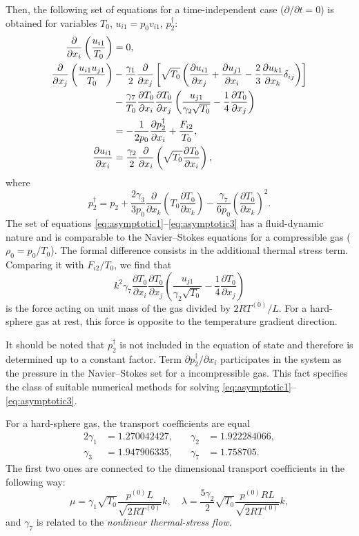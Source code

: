 \documentclass[smallextended, referee]{svjour3} %
\newcommand{\pder}[2][]{\frac{\partial#1}{\partial#2}}
\newcommand{\Pder}[2][]{\partial#1/\partial#2}
\begin{document}
Then, the following set of equations for a time-independent case (\(\Pder{t} = 0\))
is obtained for variables \(T_0\), \(u_{i1} = p_0v_{i1}\), \(p_2^\dag\):
\begin{align}
	\pder{x_i}\left(\frac{u_{i1}}{T_0}\right) &= 0, \label{eq:asymptotic1} \\
	\pder{x_j}\left(\frac{u_{i1}u_{j1}}{T_0}\right)
		&-\frac{\gamma_1}2\pder{x_j}\left[\sqrt{T_0}\left(
			\pder[u_{i1}]{x_j}+\pder[u_{j1}]{x_i}-\frac23\pder[u_{k1}]{x_k}\delta_{ij}\right
		)\right] \notag\\
		&- \frac{\gamma_7}{T_0}\pder[T_0]{x_i}\pder[T_0]{x_j}\left(\frac{u_{j1}}{\gamma_2\sqrt{T_0}} - \frac{1}4\pder[T_0]{x_j}\right) \notag\\
		&= -\frac1{2p_0}\pder[p_2^\dag]{x_i} + \frac{F_{i2}}{T_0}, \label{eq:asymptotic2} \\
	\pder[u_{i1}]{x_i} &= \frac{\gamma_2}2\pder{x_i}\left(\sqrt{T_0}\pder[T_0]{x_i}\right), \label{eq:asymptotic3}
\end{align}
where
\begin{equation}\label{eq:dag_pressure}
	p_2^\dag = p_2 +
		\frac{2\gamma_3}{3p_0}\pder{x_k}\left(T_0\pder[T_0]{x_k}\right) -
		\frac{\gamma_7}{6p_0}\left(\pder[T_0]{x_k}\right)^2.
\end{equation}
The set of equations \eqref{eq:asymptotic1}--\eqref{eq:asymptotic3} has a fluid-dynamic nature
and is comparable to the Navier--Stokes equations for a compressible gas (\(\rho_0 = p_0/T_0\)).
The formal difference consists in the additional thermal stress term.
Comparing it with \(F_{i2}/T_0\), we find that
\begin{equation}\label{eq:force}
	k^2\gamma_7\pder[T_0]{x_i}\pder[T_0]{x_j}\left(\frac{u_{j1}}{\gamma_2\sqrt{T_0}} - \frac{1}4\pder[T_0]{x_j}\right)
\end{equation}
is the force acting on unit mass of the gas divided by \(2RT^{(0)}/L\).
For a hard-sphere gas at rest, this force is opposite to the temperature gradient direction.

It should be noted that \(p_2^\dag\) is not included in the equation of state and
therefore is determined up to a constant factor.
Term \(\partial{p_2 ^ \dag} / \partial{x_i}\) participates in the system as the pressure
in the Navier--Stokes set for a incompressible gas.
This fact specifies the class of suitable numerical methods
for solving \eqref{eq:asymptotic1}--\eqref{eq:asymptotic3}.

For a hard-sphere gas, the transport coefficients are equal
\begin{alignat*}{2}
	\gamma_1 &= 1.270042427, &\quad \gamma_2 &= 1.922284066, \\
	\gamma_3 &= 1.947906335, &\quad \gamma_7 &= 1.758705.
\end{alignat*}
The first two ones are connected to the dimensional transport coefficients in the following way:
\begin{equation}
	\mu = \gamma_1\sqrt{T_0} \frac{p^{(0)}L}{\sqrt{2RT^{(0)}}} k, \quad
	\lambda = \frac{5\gamma_2}{2}\sqrt{T_0} \frac{p^{(0)}RL}{\sqrt{2RT^{(0)}}} k,
\end{equation}	
and \(\gamma_7\) is related to the \emph{nonlinear thermal-stress flow}.
\end{document}
